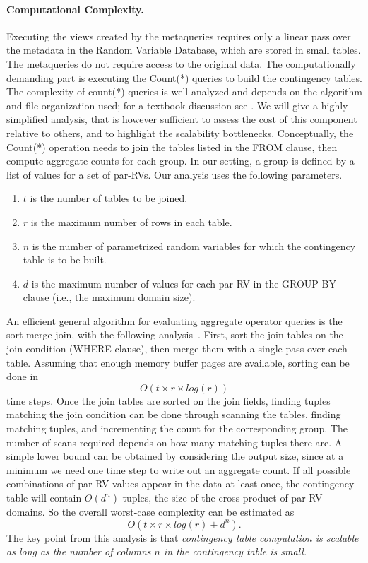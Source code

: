 \paragraph{Computational Complexity.} \label{sec:complexity-join}  Executing the views created by the metaqueries requires only a linear pass over the metadata in the Random Variable Database, which are stored in small tables. The metaqueries do not require access to the original data. The computationally demanding part is executing the Count(*) queries to build the contingency tables. The complexity of count(*) queries is well analyzed and depends on the algorithm and file organization used; for a textbook discussion see \cite[Ch.12]{Ramakrishnan2003}. We will give a highly simplified analysis, that is however sufficient to assess the cost of this \FB component relative to others, and to highlight the scalability bottlenecks. Conceptually, the Count(*) operation needs to join the tables listed in the FROM clause, then compute aggregate counts for each group. In our setting, a group is defined by a list of values for a set of par-RVs. Our analysis uses the following parameters.

\begin{enumerate}
\item $t$ is the number of tables to be joined.
\item $r$ is the maximum number of rows in each table.
\item $n$ is the number of parametrized random variables for which the contingency table is to be built.
\item $d$ is the maximum number of values for each par-RV in the GROUP BY clause (i.e., the maximum domain size).
\end{enumerate}

An efficient general algorithm for evaluating aggregate operator queries is the sort-merge join, with the following analysis~\cite[Ch.12]{Ramakrishnan2003}. First, sort the join tables on the join condition (WHERE clause), then merge them with a single pass over each table. Assuming that enough memory buffer pages are available, sorting can be done in $$O(t \times r\times log(r))$$ time steps.  Once the join tables are sorted on the join fields, finding tuples matching the join condition can be done through scanning the tables, finding matching tuples, and incrementing the count for the  corresponding group. The number of scans required depends on how many matching tuples there are. A simple lower bound can be obtained by  considering the output size, since at a minimum we need one time step to write out an aggregate count. If all possible combinations of par-RV values appear in the data at least once, the contingency table will contain $O(d^{n})$ tuples, the size of the cross-product of par-RV domains. So the overall worst-case complexity can be estimated as 
$$O(t \times r\times log(r) + d^{n}).$$ The key point from this analysis is that {\em contingency table computation is scalable as long as the number of columns $n$ in the contingency table is small.} 

